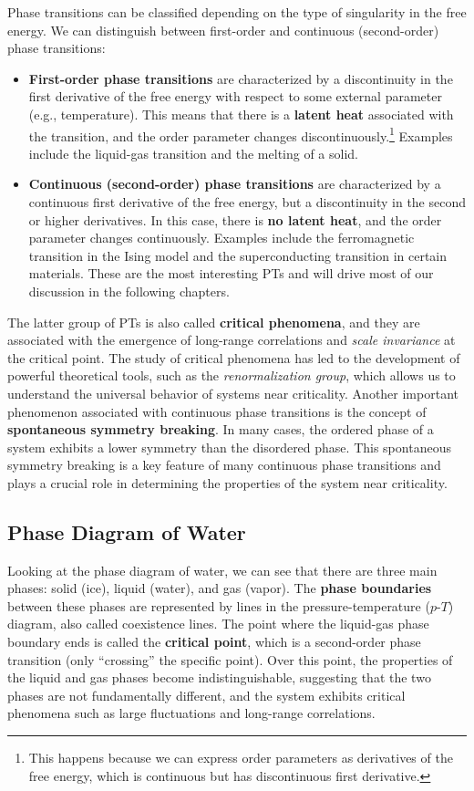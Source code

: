 Phase transitions can be classified depending on the type of singularity in the free energy. We can distinguish between first-order and continuous (second-order) phase transitions:
\begin{itemize}
    \item \textbf{First-order phase transitions} are characterized by a discontinuity in the first derivative of the free energy with respect to some external parameter (e.g., temperature). This means that there is a \textbf{latent heat} associated with the transition, and the order parameter changes discontinuously.\footnote{This happens because we can express order parameters as derivatives of the free energy, which is continuous but has discontinuous first derivative.} Examples include the liquid-gas transition and the melting of a solid.
    \item \textbf{Continuous (second-order) phase transitions} are characterized by a continuous first derivative of the free energy, but a discontinuity in the second or higher derivatives. In this case, there is \textbf{no latent heat}, and the order parameter changes continuously. Examples include the ferromagnetic transition in the Ising model and the superconducting transition in certain materials. These are the most interesting PTs and will drive most of our discussion in the following chapters.
\end{itemize}
The latter group of PTs is also called \textbf{critical phenomena}, and they are associated with the emergence of long-range correlations and \textit{scale invariance} at the critical point. The study of critical phenomena has led to the development of powerful theoretical tools, such as the \textit{renormalization group}, which allows us to understand the universal behavior of systems near criticality.
Another important phenomenon associated with continuous phase transitions is the concept of \textbf{spontaneous symmetry breaking}. In many cases, the ordered phase of a system exhibits a lower symmetry than the disordered phase. This spontaneous symmetry breaking is a key feature of many continuous phase transitions and plays a crucial role in determining the properties of the system near criticality.

\subsection{Phase Diagram of Water}

Looking at the phase diagram of water, we can see that there are three main phases: solid (ice), liquid (water), and gas (vapor). The \textbf{phase boundaries} between these phases are represented by lines in the pressure-temperature (\(p\)-\(T\)) diagram, also called coexistence lines. The point where the liquid-gas phase boundary ends is called the \textbf{critical point}, which is a second-order phase transition (only ``crossing'' the specific point). Over this point, the properties of the liquid and gas phases become indistinguishable, suggesting that the two phases are not fundamentally different, and the system exhibits critical phenomena such as large fluctuations and long-range correlations.

